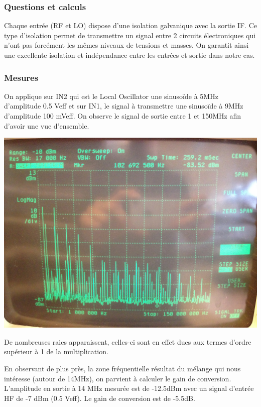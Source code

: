 \documentclass{article}
\begin{document}
\subsubsection{Questions et calculs}


Chaque entrée (RF et LO) dispose d'une isolation galvanique avec la sortie IF. Ce type d'isolation permet de transmettre un signal entre 2 circuits électroniques qui n'ont pas forcément les mêmes niveaux de tensions et masses. On garantit ainsi une excellente isolation et indépendance entre les entrées et sortie dans notre cas.

\subsubsection{Mesures}


On applique sur IN2 qui est le Local Oscillator une sinusoïde à 5MHz d’amplitude  0.5 Veff  et sur IN1, le signal à transmettre une sinusoïde à 9MHz d'amplitude 100 mVeff.
On observe le signal de sortie entre 1 et 150MHz afin d'avoir une vue d'ensemble.

\begin{center}
\includegraphics[width=0.7\linewidth]{9_3_1.jpg}
\end{center}

De nombreuses raies apparaissent, celles-ci sont en effet dues aux termes d'ordre supérieur à 1 de la multiplication.


En observant de plus près, la zone fréquentielle résultat du mélange qui nous intéresse (autour de 14MHz), on parvient à calculer le gain de conversion.
L'amplitude en sortie à 14 MHz mesurée est de -12.5dBm avec un signal d'entrée HF de -7 dBm (0.5 Veff).
Le gain de conversion est de -5.5dB.
\end{document}

